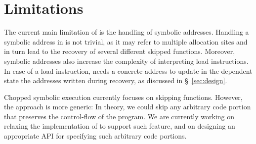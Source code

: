 \section{Limitations} The current main limitation of \toolname is
the handling of symbolic addresses. Handling a symbolic address in
\toolname is not trivial, as it may refer to multiple allocation sites
and in turn lead to the recovery of several different skipped
functions. Moreover, symbolic addresses also increase the complexity
of interpreting load instructions. In case of a load instruction,
\toolname needs a concrete address to update in the dependent state
the addresses written during recovery, as discussed in
\S~\ref{sec:design}.

Chopped symbolic execution currently focuses on skipping functions.
However, the approach is more generic: In theory, we could skip any
arbitrary code portion that preserves the control-flow of the
program. We are currently working on relaxing the implementation of
\toolname to support such feature, and on designing an appropriate API
for specifying such arbitrary code portions.

